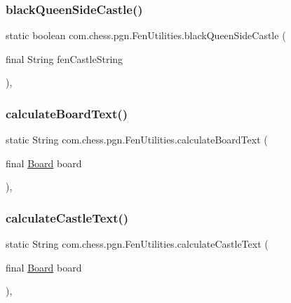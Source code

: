 \subsubsection{\texorpdfstring{blackQueenSideCastle()}{blackQueenSideCastle()}}
{\footnotesize\ttfamily static boolean com.\+chess.\+pgn.\+Fen\+Utilities.\+black\+Queen\+Side\+Castle (\begin{DoxyParamCaption}\item[{final String}]{fen\+Castle\+String }\end{DoxyParamCaption})\hspace{0.3cm}{\ttfamily [static]}, {\ttfamily [private]}}

\mbox{\label{classcom_1_1chess_1_1pgn_1_1_fen_utilities_aad23dbd3b7cbfd8f9d168de61f7ac278}} 
\subsubsection{\texorpdfstring{calculateBoardText()}{calculateBoardText()}}
{\footnotesize\ttfamily static String com.\+chess.\+pgn.\+Fen\+Utilities.\+calculate\+Board\+Text (\begin{DoxyParamCaption}\item[{final \mbox{\hyperlink{classcom_1_1chess_1_1engine_1_1classic_1_1board_1_1_board}{Board}}}]{board }\end{DoxyParamCaption})\hspace{0.3cm}{\ttfamily [static]}, {\ttfamily [private]}}

\mbox{\label{classcom_1_1chess_1_1pgn_1_1_fen_utilities_aeb0384af3b05319ac44d90b9e3b52866}} 
\subsubsection{\texorpdfstring{calculateCastleText()}{calculateCastleText()}}
{\footnotesize\ttfamily static String com.\+chess.\+pgn.\+Fen\+Utilities.\+calculate\+Castle\+Text (\begin{DoxyParamCaption}\item[{final \mbox{\hyperlink{classcom_1_1chess_1_1engine_1_1classic_1_1board_1_1_board}{Board}}}]{board }\end{DoxyParamCaption})\hspace{0.3cm}{\ttfamily [static]}, {\ttfamily [private]}}

